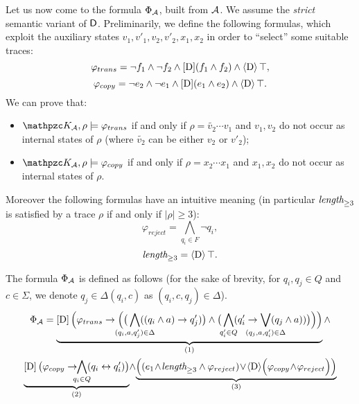 Let us now come to the formula $\Phi_{\mathcal{A}}$, built from $\mathcal{A}$. We assume the \emph{strict} semantic variant of $\mathsf{D}${}.
Preliminarily, we define the following formulas, which exploit the auxiliary states $v_1,v'_1,v_2,v'_2,x_1,x_2$ in order to ``select'' some suitable traces:
\[
    \varphi_{trans}=\neg f_1\wedge \neg f_2 \wedge \operatorname{\mathopen[ D \mathclose]}(f_1\wedge f_2) \wedge \operatorname{\langle D\rangle}\top ,
\]
\[
    \varphi_{copy}= \neg e_2\wedge \neg e_1 \wedge \operatorname{\mathopen[ D \mathclose]}(e_1\wedge e_2) \wedge \operatorname{\langle D\rangle}\top .
\]
%
We can prove that:
\begin{itemize}
    \item $\Ku_\Au,\rho\models\varphi_{trans}$ if and only if $\rho=\tilde{v_2}\cdots v_1$ and $v_1,v_2$ do not occur as internal states of $\rho$ (where $\tilde{v_2}$ can be either $v_2$ or $v'_2$);
    \item $\Ku_\Au,\rho\models\varphi_{copy}$ if and only if $\rho=x_2\cdots x_1$ and $x_1,x_2$ do not occur as internal states of $\rho$.
\end{itemize}


Moreover the following formulas have an intuitive meaning (in particular $\textit{length}_{\geq 3}$ is satisfied by a trace $\rho$ if and only if $|\rho|\geq 3$):
\[
    \varphi_{reject}= \bigwedge_{q_i\in F}\neg q_i,
\]
\[
    \textit{length}_{\geq 3}=\operatorname{\langle D\rangle}\top .
\]

The formula $\Phi_{\mathcal{A}}$ is defined as follows (for the sake of brevity, for $q_i,q_j\in Q$ and $c\in\Sigma$, we denote $q_j\in\Delta(q_i,c)$ as $(q_i,c,q_j)\in\Delta$).
\begin{multline*}
    \Phi_\Au=
     \underbrace{\hsDu\Big(\varphi_{trans}\rightarrow \Big(\big(\smashoperator{\bigwedge_{(q_i,a,q'_j)\in\Delta}}((q_i\wedge a)\rightarrow q'_j)\big) \wedge \big(\smashoperator{\bigwedge_{q'_i\in Q}} (q'_i\rightarrow \smashoperator{\bigvee_{(q_j,a,q'_i)\in\Delta}} (q_j\wedge a))\big) \Big)\Big)}_{(1)}\wedge\\
     \underbrace{\hsDu\big( \varphi_{copy} \rightarrow\!\! \smashoperator{\bigwedge_{q_i\in Q}} (q_i\leftrightarrow q'_i) \big)}_{(2)}\!\wedge\! \underbrace{\Big((e_1\!\wedge\! \Length_{\geq 3}\wedge \varphi_{reject})\!\vee\! \hsD\!\Big(\varphi_{copy}\!\wedge\!\varphi_{reject}\Big)\Big)}_{(3)}
\end{multline*}

